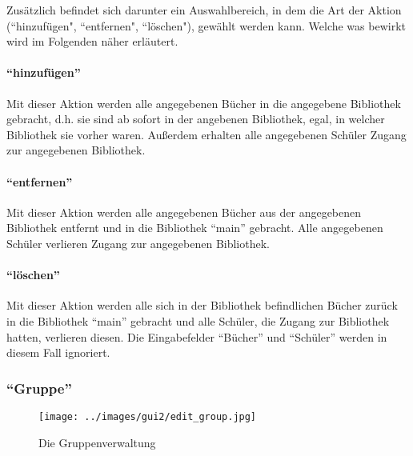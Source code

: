 Zusätzlich befindet sich darunter ein Auswahlbereich, in dem die Art der Aktion (``hinzufügen", ``entfernen", ``löschen"), gewählt werden kann. Welche was bewirkt wird im Folgenden näher erläutert.

\paragraph{``hinzufügen''}
Mit dieser Aktion werden alle angegebenen Bücher in die angegebene Bibliothek gebracht, d.h. sie sind ab sofort in der angebenen Bibliothek, egal, in welcher Bibliothek sie vorher waren. Außerdem erhalten alle angegebenen Schüler Zugang zur angegebenen Bibliothek.


\paragraph{``entfernen''}
Mit dieser Aktion werden alle angegebenen Bücher aus der angegebenen Bibliothek entfernt und in die Bibliothek ``main'' gebracht. Alle angegebenen Schüler verlieren Zugang zur angegebenen Bibliothek.

\paragraph{``löschen''}
Mit dieser Aktion werden alle sich in der Bibliothek befindlichen Bücher zurück in die Bibliothek ``main'' gebracht und alle Schüler, die Zugang zur Bibliothek hatten, verlieren diesen. Die Eingabefelder ``Bücher'' und ``Schüler'' werden in diesem Fall ignoriert.


\subsubsection{``Gruppe''}
\label{subsubsec:detail:edit:group}
\begin{figure}\texttt{[image: ../images/gui2/edit\_group.jpg]}\caption{Die Gruppenverwaltung}\label{fig:edit_group}\end{figure}

